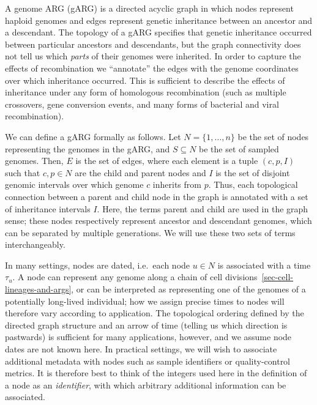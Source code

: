 \documentclass{article}
\begin{document}
A genome ARG (gARG) is a directed acyclic graph in which nodes represent
haploid genomes and edges represent
genetic inheritance between an ancestor and a descendant.
The topology of a gARG specifies that genetic inheritance
occurred between particular
ancestors and descendants, but the graph connectivity
does not tell us which \emph{parts} of their genomes were inherited.
In order to capture the effects of recombination
 we ``annotate'' the edges with the genome
coordinates over which inheritance occurred.
This is sufficient to describe the effects of inheritance under
any form of homologous recombination (such as multiple crossovers,
gene conversion events, and many forms of bacterial and viral recombination).

We can define a gARG formally as follows.
Let $N = \{1, \dots, n\}$ be the set of nodes representing
the genomes in the gARG,
and  $S \subseteq N$ be the set of sampled genomes.
Then, $E$ is the set of edges, where each element
is a tuple $(c, p, I)$ such that $c, p \in N$ are the child and
parent nodes and $I$ is the set of disjoint genomic intervals
over which genome $c$ inherits from $p$.
Thus, each topological connection between
a parent and child node in the graph is annotated with a set of
inheritance intervals $I$.
Here, the terms parent and child are used in the graph sense;
these nodes respectively represent ancestor and descendant genomes,
which can be separated by multiple generations.
We will use these two sets of terms interchangeably.

In many settings, nodes are dated, i.e.\ each
node $u\in N$ is associated with a time $\tau_u$.
A node can represent any genome along a
chain of cell divisions~\ref{sec-cell-lineages-and-args},
or can be interpreted as representing one of the genomes of a
potentially long-lived individual; how we assign precise times to nodes
will therefore vary according to application.
The topological ordering defined by the directed graph structure
and an arrow of time (telling us which direction is pastwards)
is sufficient for many applications, however,
and we assume node dates are not known here.
In practical settings, we will wish to associate additional
metadata with nodes such as sample identifiers or quality-control metrics.
It is therefore best to think of the
integers used here in the definition of a node as an \emph{identifier},
with which arbitrary additional information can be associated.
\end{document}
